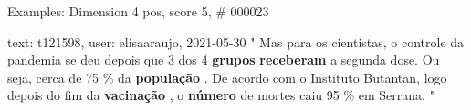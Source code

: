 \begin{frame}{Examples: Dimension 4 pos, score 5, \# 000023}
\footnotesize
\begin{exampleblock}{text: t121598, user: elisaaraujo, 2021-05-30}
" Mas para os cientistas, o controle da pandemia se deu depois que 3 dos 4 
\textbf{grupos} \textbf{receberam} a segunda dose. Ou seja, cerca de 75 \% da 
\textbf{população} . De acordo com o Instituto Butantan, logo depois do fim da 
\textbf{vacinação} , o \textbf{número} de mortes caiu 95 \% em Serrana. " 
\end{exampleblock}
\end{frame}
